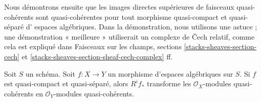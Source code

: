 \medskip\noindent
Nous démontrons ensuite que les images directes supérieures de faisceaux quasi-cohérents sont
quasi-cohérentes pour tout morphisme quasi-compact et quasi-séparé d'
espaces algébriques. Dans la démonstration, nous utilisons une astuce ; une démonstration « meilleure » utiliserait
un complexe de {\v C}ech relatif, comme cela est expliqué dans
Faisceaux sur les champs, sections \ref{stacks-sheaves-section-cech} et
\ref{stacks-sheaves-section-sheaf-cech-complex} ff.

\begin{lemma}
\label{lemma-higher-direct-image}
Soit $S$ un schéma. Soit $f : X \to Y$ un morphisme d'espaces algébriques
sur $S$. Si $f$ est quasi-compact et quasi-séparé, alors $R^if_*$
transforme les $\mathcal{O}_X$-modules quasi-cohérents en
$\mathcal{O}_Y$-modules quasi-cohérents.
\end{lemma}


